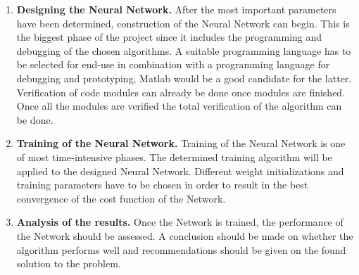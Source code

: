 \begin{enumerate}
\item \textbf{Designing the Neural Network.}
After the most important parameters have been determined, construction of the Neural Network can begin. This is the biggest phase of the project since it includes the programming and debugging of the chosen algorithms. A suitable programming language has to be selected for end-use in combination with a programming language for debugging and prototyping, Matlab would be a good candidate for the latter. Verification of code modules can already be done once modules are finished. Once all the modules are verified the total verification of the algorithm can be done.
\item \textbf{Training of the Neural Network.}
Training of the Neural Network is one of most time-intensive phases. The determined training algorithm will be applied to the designed Neural Network. Different weight initializations and training parameters have to be chosen in order to result in the best convergence of the cost function of the Network. 

\item \textbf{Analysis of the results.}
Once the Network is trained, the performance of the Network should be assessed. A conclusion should be made on whether the algorithm performs well and recommendations should be given on the found solution to the problem.
\end{enumerate}





